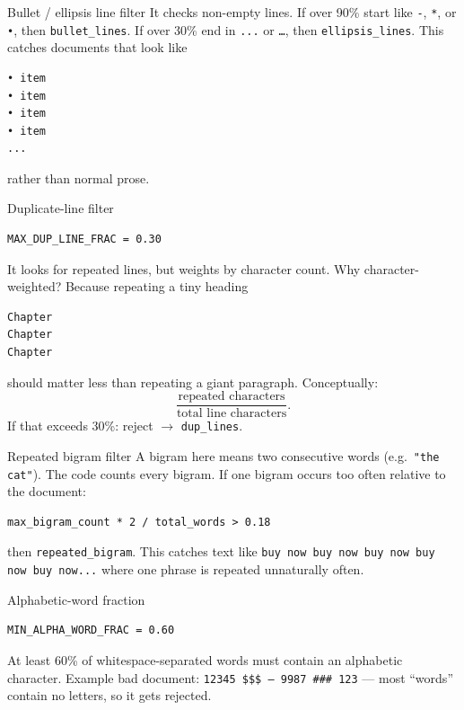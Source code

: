 \begin{paragraphblock}{Bullet / ellipsis line filter}
  It checks non-empty lines. If over 90\% start like \texttt{-}, \texttt{*},
  or \texttt{•}, then \texttt{bullet\_lines}. If over 30\% end in
  \texttt{...} or \texttt{…}, then \texttt{ellipsis\_lines}. This catches
  documents that look like
\begin{lstlisting}[style=shadedpython,language={},basicstyle=\scriptsize\ttfamily]
• item
• item
• item
• item
...
\end{lstlisting}
  rather than normal prose.
\end{paragraphblock}

\begin{paragraphblock}{Duplicate-line filter}
\begin{lstlisting}[style=shadedpython]
MAX_DUP_LINE_FRAC = 0.30
\end{lstlisting}
  It looks for repeated lines, but weights by character count. Why
  character-weighted? Because repeating a tiny heading
\begin{lstlisting}[style=shadedpython,language={},basicstyle=\scriptsize\ttfamily]
Chapter
Chapter
Chapter
\end{lstlisting}
  should matter less than repeating a giant paragraph. Conceptually:
  \[
    \frac{\text{repeated characters}}{\text{total line characters}}.
  \]
  If that exceeds 30\%: reject $\rightarrow$ \texttt{dup\_lines}.
\end{paragraphblock}

\begin{paragraphblock}{Repeated bigram filter}
  A bigram here means two consecutive words (e.g.\ \texttt{"the cat"}). The
  code counts every bigram. If one bigram occurs too often relative to the
  document:
\begin{lstlisting}[style=shadedpython]
max_bigram_count * 2 / total_words > 0.18
\end{lstlisting}
  then \texttt{repeated\_bigram}. This catches text like
  \texttt{buy now buy now buy now buy now buy now...} where one phrase is
  repeated unnaturally often.
\end{paragraphblock}

\begin{paragraphblock}{Alphabetic-word fraction}
\begin{lstlisting}[style=shadedpython]
MIN_ALPHA_WORD_FRAC = 0.60
\end{lstlisting}
  At least 60\% of whitespace-separated words must contain an alphabetic
  character. Example bad document: \texttt{12345 \$\$\$ --- 9987 \#\#\# 123}
  --- most ``words'' contain no letters, so it gets rejected.
\end{paragraphblock}


